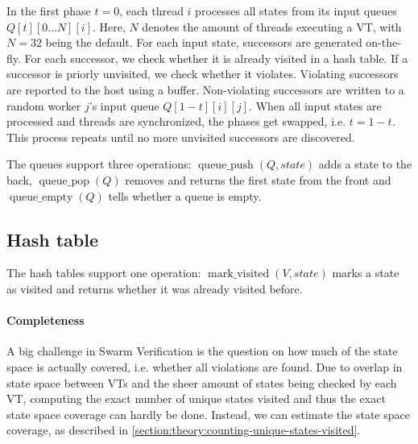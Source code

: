 \documentclass[
fancyheadings, %
%
%
]{stsreprt}
\DeclareMathOperator{\markVisited}{mark\_visited}
\DeclareMathOperator{\qEmpty}{queue\_empty}
\DeclareMathOperator{\qPop}{queue\_pop}
\DeclareMathOperator{\qPush}{queue\_push}
\begin{document}
In the first phase $t=0$, each thread $i$ processes all states from its input queues $Q\left[t\right]\left[ 0 \dots N \right]\left[i\right]$.
Here, $N$ denotes the amount of threads executing a VT, with $N=32$ being the default.
For each input state, successors are generated on-the-fly.
For each successor, we check whether it is already visited in a hash table.
If a successor is priorly unvisited, we check whether it violates.
Violating successors are reported to the host using a buffer.
Non-violating successors are written to a random worker $j$'s input queue $Q\left[1 - t\right]\left[i\right]\left[j\right]$.
When all input states are processed and threads are synchronized, the phases get swapped, i.e. $t = 1 - t$.
This process repeats until no more unvisited successors are discovered.


The queues support three operations: $\qPush(Q, state)$ adds a state to the back, $\qPop(Q)$ removes and returns the first state from the front and $\qEmpty(Q)$ tells whether a queue is empty.

\subsection{Hash table}
\label{section:theory:hash-table}

The hash tables support one operation: $\markVisited(V, state)$ marks a state as visited and returns whether it was already visited before.





\paragraph{Completeness} A big challenge in Swarm Verification is the question on how much of the state space is actually covered, i.e. whether all violations are found.
Due to overlap in state space between VTs and the sheer amount of states being checked by each VT, computing the exact number of unique states visited and thus the exact state space coverage can hardly be done.
Instead, we can estimate the state space coverage, as described in \cref{section:theory:counting-unique-states-visited}.
\end{document}
